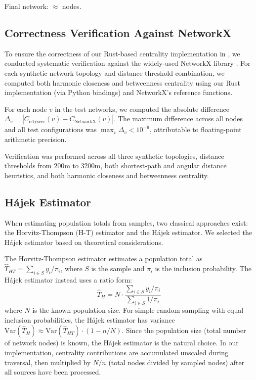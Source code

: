 Final network: $\approx$ \glaNnodes{} nodes.

\subsection{Correctness Verification Against NetworkX}
\label{sec:appendix_networkx}

To ensure the correctness of our Rust-based centrality implementation in \cityseer{}, we conducted systematic verification against the widely-used NetworkX library \citep{Hagberg2008}. For each synthetic network topology and distance threshold combination, we computed both harmonic closeness and betweenness centrality using our Rust implementation (via \cityseer{} Python bindings) and NetworkX's reference functions.

For each node $v$ in the test networks, we computed the absolute difference $\Delta_v = |C_{\text{cityseer}}(v) - C_{\text{NetworkX}}(v)|$. The maximum difference across all nodes and all test configurations was $\max_v \Delta_v < 10^{-6}$, attributable to floating-point arithmetic precision.

Verification was performed across all three synthetic topologies, distance thresholds from 200m to 3200m, both shortest-path and angular distance heuristics, and both harmonic closeness and betweenness centrality.

\subsection{H\'{a}jek Estimator}
\label{sec:appendix_hajek}

When estimating population totals from samples, two classical approaches exist: the Horvitz-Thompson (H-T) estimator and the H\'{a}jek estimator. We selected the H\'{a}jek estimator based on theoretical considerations.

The Horvitz-Thompson estimator \citep{Horvitz1952} estimates a population total as $\hat{T}_{HT} = \sum_{i \in S} y_i / \pi_i$, where $S$ is the sample and $\pi_i$ is the inclusion probability. The H\'{a}jek estimator \citep{Hajek1971} instead uses a ratio form:
\begin{equation}
    \hat{T}_{H} = N \cdot \frac{\sum_{i \in S} y_i / \pi_i}{\sum_{i \in S} 1 / \pi_i}
\end{equation}
where $N$ is the known population size. For simple random sampling with equal inclusion probabilities, the H\'{a}jek estimator has variance $\text{Var}(\hat{T}_{H}) \approx \text{Var}(\hat{T}_{HT}) \cdot (1 - n/N)$. Since the population size (total number of network nodes) is known, the H\'{a}jek estimator is the natural choice. In our implementation, centrality contributions are accumulated unscaled during traversal, then multiplied by $N/n$ (total nodes divided by sampled nodes) after all sources have been processed.

